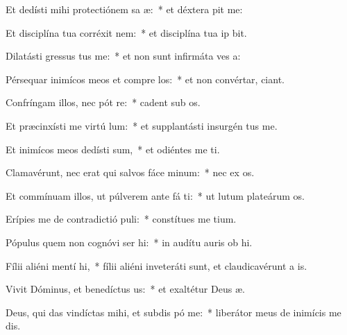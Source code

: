 \item Et dedísti mihi protectiónem sa æ:~* et déxtera  pit me:
\item Et disciplína tua corréxit   nem:~* et disciplína tua ip  bit.
\item Dilatásti gressus  tus me:~* et non sunt infirmáta ves a:
\item Pérsequar inimícos meos et compre los:~* et non convértar,  ciant.
\item Confríngam illos, nec pót re:~* cadent sub  os.
\item Et præcinxísti me virtú  lum:~* et supplantásti insurgén   tus me.
\item Et inimícos meos dedísti  sum,~* et odiéntes me ti.
\item Clamavérunt, nec erat qui salvos fáce  minum:~* nec ex os.
\item Et commínuam illos, ut púlverem ante fá ti:~* ut lutum plateárum  os.
\item Erípies me de contradictió puli:~* constítues me   tium.
\item Pópulus quem non cognóvi ser hi:~* in audítu auris ob hi.
\item Fílii aliéni mentí  hi,~* fílii aliéni inveteráti sunt, et claudicavérunt a  is.
\item Vivit Dóminus, et benedíctus  us:~* et exaltétur Deus  æ.
\item Deus, qui das vindíctas mihi, et subdis pó  me:~* liberátor meus de inimícis me dis.
